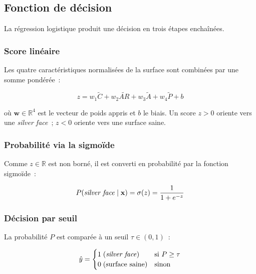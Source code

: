\subsection{Fonction de décision}
\label{subsec:decision-function}

La régression logistique produit une décision en trois étapes enchaînées.

\subsubsection{Score linéaire}

Les quatre caractéristiques normalisées de la surface sont combinées par une somme pondérée~:

\begin{equation}
    z = w_1\tilde{C} + w_2\widetilde{AR} + w_3\tilde{A} + w_4\tilde{P} + b
    \label{eq:score-lineaire}
\end{equation}

où $\mathbf{w} \in \mathbb{R}^4$ est le vecteur de poids appris et $b$ le biais. Un score $z > 0$ oriente vers une \textit{silver face}~; $z < 0$ oriente vers une surface saine.

\subsubsection{Probabilité via la sigmoïde}

Comme $z \in \mathbb{R}$ est non borné, il est converti en probabilité par la fonction sigmoïde~:

\begin{equation}
    P\!\left(\text{\textit{silver face}} \mid \mathbf{x}\right) = \sigma(z) = \frac{1}{1 + e^{-z}}
    \label{eq:sigmoid}
\end{equation}

\subsubsection{Décision par seuil}

La probabilité $P$ est comparée à un seuil $\tau \in (0,1)$~:

\begin{equation}
    \hat{y} = \begin{cases}
        1 \;\text{(\textit{silver face})} & \text{si } P \geq \tau \\
        0 \;\text{(surface saine)}        & \text{sinon}
    \end{cases}
    \label{eq:decision}
\end{equation}

